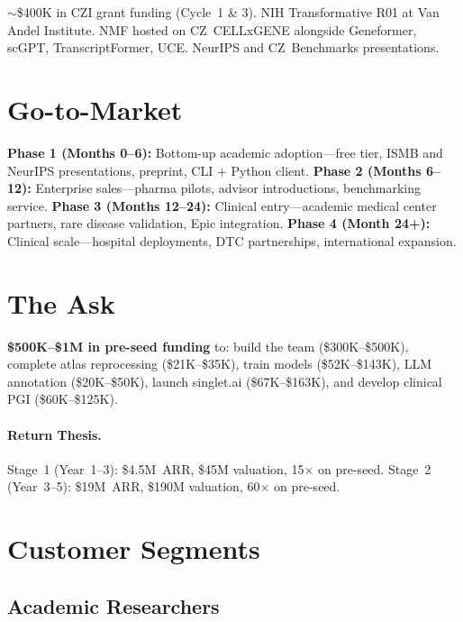 \documentclass[10pt,twocolumn,letterpaper]{article}
\begin{document}
$\sim$\$400K in CZI grant funding (Cycle~1 \& 3). NIH Transformative R01 at Van
Andel Institute. NMF hosted on CZ~CELLxGENE alongside Geneformer, scGPT,
TranscriptFormer, UCE. NeurIPS and CZ~Benchmarks presentations.

\section{Go-to-Market}
\label{sec:gtm}

\textbf{Phase 1 (Months 0--6):} Bottom-up academic adoption---free tier, ISMB
and NeurIPS presentations, preprint, CLI + Python client.
\textbf{Phase 2 (Months 6--12):} Enterprise sales---pharma pilots, advisor
introductions, benchmarking service.
\textbf{Phase 3 (Months 12--24):} Clinical entry---academic medical center
partners, rare disease validation, Epic integration.
\textbf{Phase 4 (Month 24+):} Clinical scale---hospital deployments, DTC
partnerships, international expansion.

\section{The Ask}
\label{sec:ask}

\textbf{\$500K--\$1M in pre-seed funding} to: build the team (\$300K--\$500K),
complete atlas reprocessing (\$21K--\$35K), train models (\$52K--\$143K), LLM
annotation (\$20K--\$50K), launch singlet.ai (\$67K--\$163K), and develop
clinical PGI (\$60K--\$125K).

\paragraph{Return Thesis.} Stage~1 (Year~1--3): \$4.5M~ARR, \$45M valuation,
15$\times$ on pre-seed. Stage~2 (Year~3--5): \$19M~ARR, \$190M valuation,
60$\times$ on pre-seed.

\section{Customer Segments}
\label{sec:customers}

\subsection{Academic Researchers}
\end{document}

